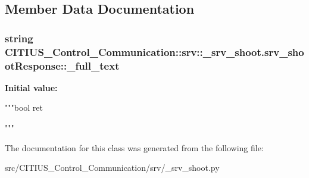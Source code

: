 \subsection{\-Member \-Data \-Documentation}
\hypertarget{class_c_i_t_i_u_s___control___communication_1_1srv_1_1__srv__shoot_1_1srv__shoot_response_a31dc13e2b109e32e4b7abb4e863ee11b}{
\subsubsection[{\-\_\-full\-\_\-text}]{\setlength{\rightskip}{0pt plus 5cm}string \-C\-I\-T\-I\-U\-S\-\_\-\-Control\-\_\-\-Communication\-::srv\-::\-\_\-srv\-\_\-shoot.\-srv\-\_\-shoot\-Response\-::\-\_\-full\-\_\-text}}\label{class_c_i_t_i_u_s___control___communication_1_1srv_1_1__srv__shoot_1_1srv__shoot_response_a31dc13e2b109e32e4b7abb4e863ee11b}
{\bfseries \-Initial value\-:}
\begin{DoxyCode}
"""bool ret


"""
\end{DoxyCode}


\-The documentation for this class was generated from the following file\-:\begin{DoxyCompactItemize}
\item 
src/\-C\-I\-T\-I\-U\-S\-\_\-\-Control\-\_\-\-Communication/srv/\-\_\-srv\-\_\-shoot.\-py\end{DoxyCompactItemize}
